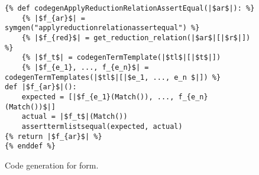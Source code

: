 \begin{figure}[ht]
\begin{verbatim}
{% def codegenApplyReductionRelationAssertEqual(|$ar$|): %}
	{% |$f_{ar}$| = symgen("applyreductionrelationassertequal") %}
	{% |$f_{red}$| = get_reduction_relation(|$ar$|[|$r$|]) %}
	{% |$f_t$| = codegenTermTemplate(|$tl$|[|$t$|])
	{% |$f_{e_1}, ..., f_{e_n}$| = codegenTermTemplates(|$tl$|[|$e_1, ..., e_n $|]) %}
def |$f_{ar}$|():
	expected = [|$f_{e_1}(Match()), ..., f_{e_n}(Match())$|]
	actual = |$f_t$|(Match())
	asserttermlistsequal(expected, actual)
{% return |$f_{ar}$| %}
{% enddef %}
\end{verbatim}
\caption{Code generation for \ApplyReductionRelationAssertEqualNoArgs \space form.}
\label{codegen-applyred}
\end{figure}
